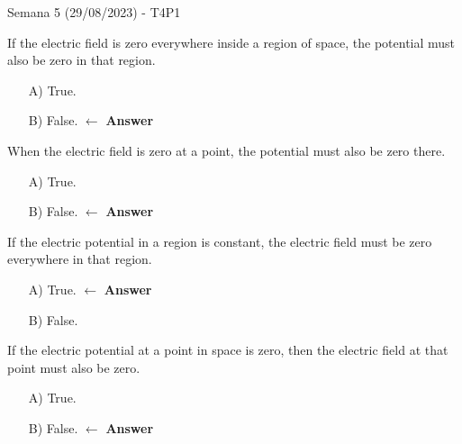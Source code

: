 \begin{frame}{Semana 5 (29/08/2023) - T4P1}
    
    If the electric field is zero everywhere inside a region of space, the potential must also be zero in that region.
    
    \begin{itemize}
        \item[A)] True.
        \item[B)] False. $\leftarrow$ \textbf{Answer}
    \end{itemize}
    
    
    When the electric field is zero at a point, the potential must also be zero there.
    
    \begin{itemize}
        \item[A)] True.
        \item[B)] False. $\leftarrow$ \textbf{Answer}
    \end{itemize}
    
    If the electric potential in a region is constant, the electric field must be zero everywhere in that region.
    
    \begin{itemize}
        \item[A)] True. $\leftarrow$ \textbf{Answer}
        \item[B)] False.
    \end{itemize}
    
    If the electric potential at a point in space is zero, then the electric field at that point must also be zero.
    
    \begin{itemize}
        \item[A)] True.
        \item[B)] False. $\leftarrow$ \textbf{Answer}
    \end{itemize}
    
\end{frame}

